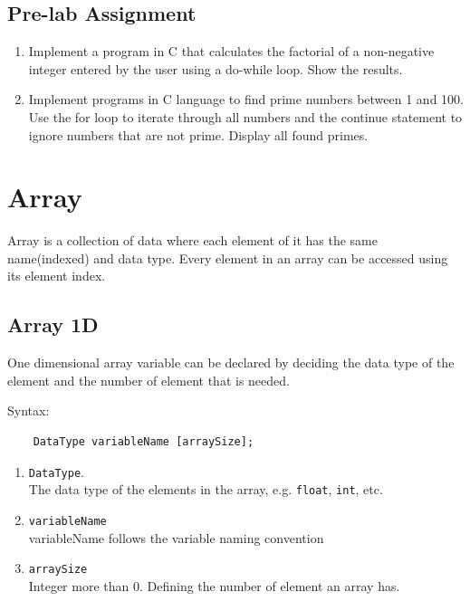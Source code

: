 \subsection{Pre-lab Assignment}
\begin{enumerate}
	\item Implement a program in C that calculates the factorial of a non-negative integer entered by the user using a do-while loop. Show the results.
	\item Implement programs in C language to find prime numbers between 1 and 100. Use the for loop to iterate through all numbers and the continue statement to ignore numbers that are not prime. Display all found primes.
\end{enumerate}

\section{Array}
Array is a collection of data where each element of it has the same name(indexed) and data type. Every element in an array can be accessed using its element index.
\subsection{Array 1D}
One dimensional array variable can be declared by deciding the data type of the element and the number of element that is needed.

Syntax:
\begin{verbatim}
    DataType variableName [arraySize];
\end{verbatim}
\begin{enumerate}
	\item \verb*|DataType|.\\
	      The data type of the elements in the array, e.g. \verb|float|, \verb|int|, etc.
	\item \verb*|variableName|\\
	      variableName follows the variable naming convention

	\item \verb*|arraySize| \\
	      Integer more than 0. Defining the number of element an array has.
\end{enumerate}

